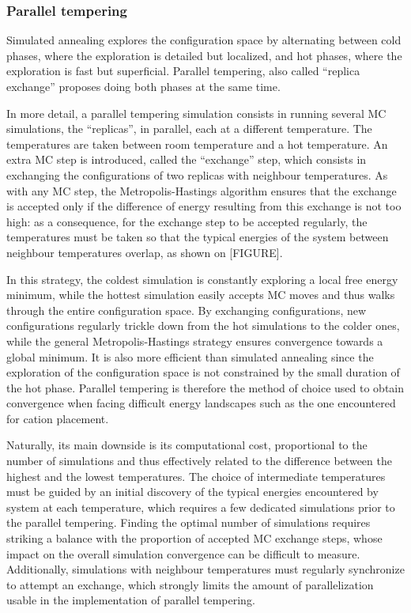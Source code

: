 \documentclass[main.tex]{subfiles}
\begin{document}

\subsubsection{Parallel tempering}

\label{paralleltempering}

Simulated annealing explores the configuration space by alternating between cold phases, where the exploration is detailed but localized, and hot phases, where the exploration is fast but superficial. Parallel tempering, also called ``replica exchange'' proposes doing both phases at the same time.

In more detail, a parallel tempering simulation consists in running several MC simulations, the ``replicas'', in parallel, each at a different temperature. The temperatures are taken between room temperature and a hot temperature. An extra MC step is introduced, called the ``exchange'' step, which consists in exchanging the configurations of two replicas with neighbour temperatures. As with any MC step, the Metropolis-Hastings algorithm ensures that the exchange is accepted only if the difference of energy resulting from this exchange is not too high: as a consequence, for the exchange step to be accepted regularly, the temperatures must be taken so that the typical energies of the system between neighbour temperatures overlap, as shown on [FIGURE].

In this strategy, the coldest simulation is constantly exploring a local free energy minimum, while the hottest simulation easily accepts MC moves and thus walks through the entire configuration space. By exchanging configurations, new configurations regularly trickle down from the hot simulations to the colder ones, while the general Metropolis-Hastings strategy ensures convergence towards a global minimum. It is also more efficient than simulated annealing since the exploration of the configuration space is not constrained by the small duration of the hot phase. Parallel tempering is therefore the method of choice used to obtain convergence when facing difficult energy landscapes such as the one encountered for cation placement.

Naturally, its main downside is its computational cost, proportional to the number of simulations and thus effectively related to the difference between the highest and the lowest temperatures. The choice of intermediate temperatures must be guided by an initial discovery of the typical energies encountered by system at each temperature, which requires a few dedicated simulations prior to the parallel tempering. Finding the optimal number of simulations requires striking a balance with the proportion of accepted MC exchange steps, whose impact on the overall simulation convergence can be difficult to measure. Additionally, simulations with neighbour temperatures must regularly synchronize to attempt an exchange, which strongly limits the amount of parallelization usable in the implementation of parallel tempering.
\end{document}
